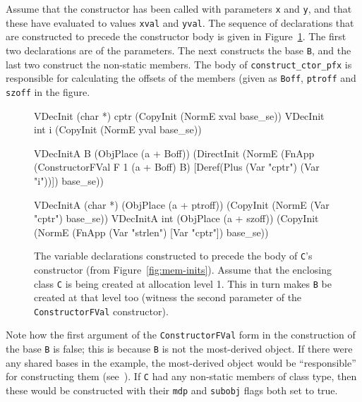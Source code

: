 \documentclass[11pt]{article}
\begin{document}
Assume that the constructor has been called with parameters \texttt{x}
and \texttt{y}, and that these have evaluated to values \texttt{xval}
and \texttt{yval}. The sequence of declarations that are constructed
to precede the constructor body is given in
Figure~\ref{fig:constructor-vdecs}. The first two declarations are of
the parameters.  The next constructs the base \texttt{B}, and the last
two construct the non-static members.  The body of
\texttt{construct_ctor_pfx} is responsible for calculating the offsets
of the members (given as \texttt{Boff}, \texttt{ptroff} and
\texttt{szoff} in the figure.

\begin{figure}[hbtp]
\begin{stdrule}
  VDecInit (char *) cptr (CopyInit (NormE xval base_se))
  VDecInit int      i    (CopyInit (NormE yval base_se))

  VDecInitA B (ObjPlace (a + Boff))
              (DirectInit
                 (NormE
                    (FnApp (ConstructorFVal F 1 (a + Boff) B)
                           [Deref(Plus (Var "cptr")
                                       (Var "i"))])
                    base_se))

  VDecInitA (char *) (ObjPlace (a + ptroff))
                     (CopyInit (NormE (Var "cptr") base_se))
  VDecInitA int      (ObjPlace (a + szoff))
                     (CopyInit (NormE (FnApp (Var "strlen")
                                             [Var "cptr"])
                                      base_se))
\end{stdrule}
  \caption[Variable Declarations Generated from
  Figure~\ref{fig:mem-inits}]{The variable declarations constructed to
    precede the body of \texttt{C}'s constructor (from
    Figure~\ref{fig:mem-inits}).  Assume that the enclosing class
    \texttt{C} is being created at allocation level 1.  This in turn
    makes \texttt{B} be created at that level too (witness the second
    parameter of the \texttt{ConstructorFVal} constructor). }
\label{fig:constructor-vdecs}
\end{figure}

Note how the first argument of the \texttt{ConstructorFVal} form in
the construction of the base \texttt{B} is false; this is because
\texttt{B} is not the most-derived object.  If there were any shared
bases in the example, the most-derived object would be ``responsible''
for constructing them (see~\cite[\S12.6.2, paragraph
5]{cpp-standard-iso14882}).  If \texttt{C} had any non-static members
of class type, then these would be constructed with their
\texttt{mdp} and \texttt{subobj} flags both set to true.
\end{document}
